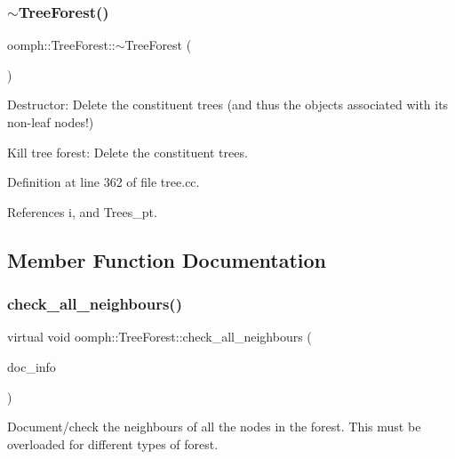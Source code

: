 \subsubsection{\texorpdfstring{$\sim$\+Tree\+Forest()}{~TreeForest()}}
{\footnotesize\ttfamily oomph\+::\+Tree\+Forest\+::$\sim$\+Tree\+Forest (\begin{DoxyParamCaption}{ }\end{DoxyParamCaption})\hspace{0.3cm}{\ttfamily [virtual]}}



Destructor\+: Delete the constituent trees (and thus the objects associated with its non-\/leaf nodes!) 

Kill tree forest\+: Delete the constituent trees. 

Definition at line 362 of file tree.\+cc.



References i, and Trees\+\_\+pt.



\subsection{Member Function Documentation}
\mbox{\label{classoomph_1_1TreeForest_a0e6a7f821d9f14374c6d23d8766c7679}} 
\subsubsection{\texorpdfstring{check\+\_\+all\+\_\+neighbours()}{check\_all\_neighbours()}}
{\footnotesize\ttfamily virtual void oomph\+::\+Tree\+Forest\+::check\+\_\+all\+\_\+neighbours (\begin{DoxyParamCaption}\item[{\hyperlink{classoomph_1_1DocInfo}{Doc\+Info} \&}]{doc\+\_\+info }\end{DoxyParamCaption})\hspace{0.3cm}{\ttfamily [pure virtual]}}



Document/check the neighbours of all the nodes in the forest. This must be overloaded for different types of forest. 



